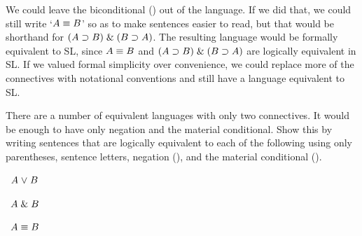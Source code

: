 \problempart
{}\label{pr.altConnectives}
We could leave the biconditional (\eiff) out of the language. If we did that, we could still write `$A\equiv B$' so as to make sentences easier to read, but that would be shorthand for $(A\supset B) \mathrel\& (B\supset A)$. The resulting language would be formally equivalent to SL, since $A\equiv B$ and $(A\supset B) \mathrel\& (B\supset A)$ are logically equivalent in SL. If we valued formal simplicity over convenience, we could replace more of the connectives with notational conventions and still have a language equivalent to SL. 

There are a number of equivalent languages with only two connectives. It would be enough to have only negation and the material conditional. Show this by writing sentences that are logically equivalent to each of the following using only parentheses, sentence letters, negation (\enot), and the material conditional (\eif).
\begin{earg}
\item\leftsolutions\ $A\mkern1mu\vee\mkern1mu B$
\item\leftsolutions\ $A\mathrel\& B$
\item\leftsolutions\ $A\equiv B$
\end{earg}

